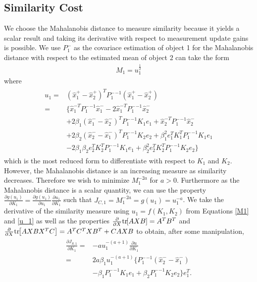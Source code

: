 \documentclass[letterpaper, 10pt, conference]{ieeeconf}
\newcommand{\bracket}[1]{\ensuremath{\left[ #1 \right]}}
\newcommand{\tr}[1]{\mathrm{tr}\ensuremath{\negthickspace\bracket{#1}}}
\begin{document}
 \subsection{Similarity Cost} We choose the Mahalanobis distance to measure similarity because it yields a scalar result and taking its derivative with respect to measurement update gains is possible. We use $P_1^-$ as the covariace estimation of object 1 for the Mahalanobis distance with respect to the estimated mean of object $2$ can take the form
\begin{align}
\label{M1}
M_1=u_1^{\frac{1}{2}}
\end{align}
where
\begin{align} \label{u_1}
\begin{split}
u_1=&(\hat x_1^+-\hat x_2^+)^{T}{P_1^-}^{-1}(\hat x_1^+-\hat x_2^+)\\
=&\{\hat x_1^{-T}{P_1^-}^{-1}\hat x_1^-
-2\hat x_1^{-T}{P_1^-}^{-1}\hat x_2^-\\
&+2\beta_1(\hat x_1^{-}-\hat x_2^{-})^T{P_1^-}^{-1}K_1e_1
+\hat x_2^{-T}{P_1^-}^{-1}\hat x_2^-\\
&+2\beta_2(\hat x_2^{-}-\hat x_1^{-})^T{P_1^-}^{-1}K_2e_2
+\beta_1^2e_1^TK_1^T{P_1^-}^{-1}K_1e_1\\
&-2\beta_1\beta_2e_2^TK_2^T{P_1^-}^{-1}K_1e_1+\beta_2^2e_2^TK_2^T{P_1^-}^{-1}K_2e_2\}
\end{split}
\end{align}
which is the most reduced form to differentiate with respect to $K_1$ and $K_2$. However, the Mahalanobis distance is an increasing measure as similarity decreases. Therefore we wish to minimize $M_1^{-2a}$ for $a>0$. Furthermore as the Mahalanobis distance is a scalar quantity, we can use the property $\frac{\partial g(u_1)}{\partial K_1}=\frac{\partial g(u_1)}{\partial u_1}\frac{\partial u_1}{\partial K_1}$ such that $J_{C,1}=M_1^{-2a}=g(u_1)=u_1^{-a}$. We take the derivative of the similarity measure using $u_1=f(K_1,K_2)$ from Equations \ref{M1} and \ref{u_1} as well as the properties $\frac{\partial}{\partial X} \tr{AXB}=A^TB^T$ and $\frac{\partial}{\partial X}\tr{AXBX^TC}=A^TC^TXB^T+CAXB$ to obtain, after some manipulation,
\begin{align}
\begin{split}
\label{CostS}
\frac{\partial J_{S,1}}{\partial K_1}=&-au_1^{-(a+1)}\frac{\partial u}{\partial K_1}\\
=&2a\beta_1u_1^{-(a+1)}\{
{P_1^-}^{-1}(\hat x_2^--\hat x_1^-)\\
&-\beta_1{P_1^-}^{-1}K_1e_1
+\beta_2{P_1^-}^{-1}K_2e_2
\}e_1^T.
\end{split}
\end{align}
\end{document}
